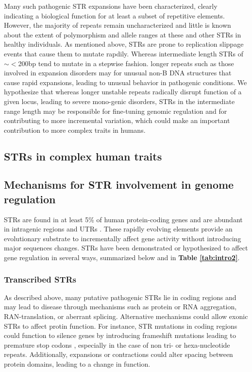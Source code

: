 Many such pathogenic STR expansions have been characterized, clearly indicating a biological function for at least a subset of repetitive elements. However, the majority of repeats remain uncharacterized and little is known about the extent of polymorphism and allele ranges at these and other STRs in healthy individuals. As mentioned above, STRs are prone to replication slippage events that cause them to mutate rapdily. Whereas intermediate length STRs of $\sim<$200bp tend to mutate in a stepwise fashion. longer repeats such as those involved in expansion disorders may for unusual non-B DNA structures \cite{KozlowskiSobczakKrzyzosiak2010} that cause rapid expansions, leading to unusual behavior in pathogenic conditions. We hypothesize that whereas longer unstable repeats radically disrupt function of a given locus, leading to severe mono-genic disorders, STRs in the intermediate range length may be responsible for fine-tuning genomic regulation and for contributing to more incremental variation, which could make an important contribution to more complex traits in humans.

\subsection{STRs in complex human traits}

\subsection{Mechanisms for STR involvement in genome regulation}
STRs are found in at least 5\% of human protein-coding genes \cite{ODushlaineEdwardsParkEtAl2005} and are abundant in intragenic regions and UTRs \cite{LiKorolFahimaEtAl2004}. These rapidly evolving elements provide an evolutionary substrate to incrementally affect gene activity without introducing major sequences changes. STRs have been demonstrated or hypothesized to affect gene regulation in several ways, summarized below and in \textbf{Table \ref{tab:intro2}}.

\subsubsection{Transcribed STRs}
As described above, many putative pathogenic STRs lie in coding regions and may lead to disease through mechanisms such as protein or RNA aggregation, RAN-translation, or aberrant splicing. Alternative mechanisms could allow exonic STRs to affect protin function. For instance, STR mutations in coding regions could function to silence genes by introducing frameshift mutations leading to premature stop codons \cite{GemayelVincesLegendreEtAl2010}, especially in the case of non tri- or hexa-nucleotide repeats. Additionally, expansions or contractions could alter spacing between protein domains, leading to a change in function.

